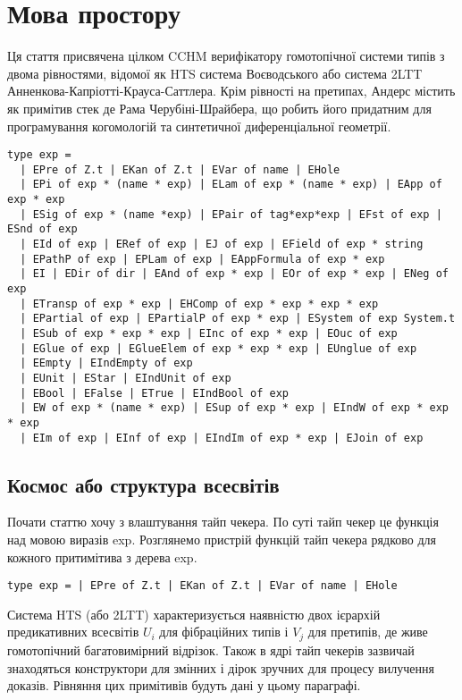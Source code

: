 \section{Мова простору}

Ця стаття присвячена цілком CCHM верифікатору гомотопічної системи типів з
двома рівностями, відомої як HTS система Воєводського або система 2LTT
Анненкова-Капріотті-Крауса-Саттлера. Крім рівності на претипах,
Андерс містить як примітив стек де Рама Черубіні-Шрайбера, що робить
його придатним для програмування когомологій та синтетичної диференціальної геометрії.

\begin{lstlisting}
type exp =
  | EPre of Z.t | EKan of Z.t | EVar of name | EHole
  | EPi of exp * (name * exp) | ELam of exp * (name * exp) | EApp of exp * exp
  | ESig of exp * (name *exp) | EPair of tag*exp*exp | EFst of exp | ESnd of exp
  | EId of exp | ERef of exp | EJ of exp | EField of exp * string
  | EPathP of exp | EPLam of exp | EAppFormula of exp * exp
  | EI | EDir of dir | EAnd of exp * exp | EOr of exp * exp | ENeg of exp
  | ETransp of exp * exp | EHComp of exp * exp * exp * exp
  | EPartial of exp | EPartialP of exp * exp | ESystem of exp System.t
  | ESub of exp * exp * exp | EInc of exp * exp | EOuc of exp
  | EGlue of exp | EGlueElem of exp * exp * exp | EUnglue of exp
  | EEmpty | EIndEmpty of exp
  | EUnit | EStar | EIndUnit of exp
  | EBool | EFalse | ETrue | EIndBool of exp
  | EW of exp * (name * exp) | ESup of exp * exp | EIndW of exp * exp * exp
  | EIm of exp | EInf of exp | EIndIm of exp * exp | EJoin of exp
\end{lstlisting}

\subsection*{Космос або структура всесвітів}

Почати статтю хочу з влаштування тайп чекера. По суті тайп чекер
це функція над мовою виразів exp. Розглянемо пристрій функцій тайп
чекера рядково для кожного притимітива з дерева exp.

\begin{lstlisting}
type exp = | EPre of Z.t | EKan of Z.t | EVar of name | EHole
\end{lstlisting}

Система HTS (або 2LTT) характеризується наявністю двох ієрархій
предикативних всесвітів $U_i$ для фібраційних типів і $V_j$ для претипів,
де живе гомотопічний багатовимірний відрізок. Також в ядрі тайп чекерів
зазвичай знаходяться конструктори для змінних і дірок зручних для процесу
вилучення доказів. Рівняння цих примітивів будуть дані у цьому параграфі.

